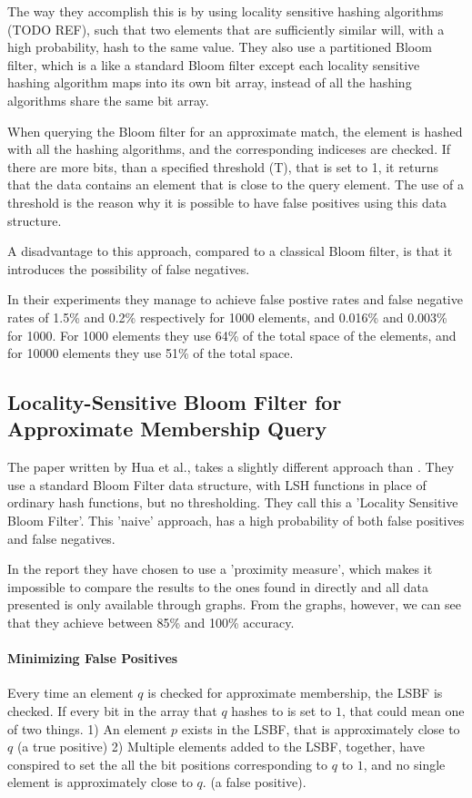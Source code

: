 \documentclass[a4paper,11pt]{article}
\begin{document}
The way they accomplish this is by using locality sensitive hashing algorithms (TODO REF), such that two elements that are sufficiently similar will, with a high probability, hash to the same value. They also use a partitioned Bloom filter, which is a like a standard Bloom filter except each locality sensitive hashing algorithm maps into its own bit array, instead of all the hashing algorithms share the same bit array.

When querying the Bloom filter for an approximate match, the element is hashed with all the hashing algorithms, and the corresponding indiceses are checked. If there are more bits, than a specified threshold (T), that is set to 1, it returns that the data contains an element that is close to the query element. The use of a threshold is the reason why it is possible to have false positives using this data structure.

A disadvantage to this approach, compared to a classical Bloom filter, is that it introduces the possibility of false negatives.

In their experiments they manage to achieve false postive rates and false negative rates of 1.5\% and 0.2\% respectively for 1000 elements, and 0.016\% and 0.003\% for 1000. For 1000 elements they use 64\% of the total space of the elements, and for 10000 elements they use 51\% of the total space.



\subsection{Locality-Sensitive Bloom Filter for Approximate Membership Query}
The paper written by Hua et al.\cite{paper:hua}, takes a slightly different approach than \cite{paper:harvard}. They use a standard Bloom Filter data structure, with LSH functions in place of ordinary hash functions, but no thresholding. They call this a 'Locality Sensitive Bloom Filter'. This 'naive' approach, has a high probability of both false positives and false negatives.

In the report they have chosen to use a 'proximity measure', which makes it impossible to compare the results to the ones found in \cite{paper:harvard} directly and all data presented is only available through graphs. From the graphs, however, we can see that they achieve between 85\% and 100\% accuracy.

\paragraph{Minimizing False Positives}
Every time an element $q$ is checked for approximate membership, the LSBF is checked. If every bit in the array that $q$ hashes to is set to $1$, that could mean one of two things.
1) An element $p$ exists in the LSBF, that is approximately close to $q$ (a true positive)
2) Multiple elements added to the LSBF, together, have conspired to set the all the bit positions corresponding to $q$ to $1$, and no single element is approximately close to $q$. (a false positive).
\end{document}
